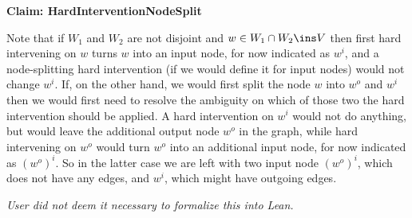 \noindent\textbf{Claim: HardInterventionNodeSplit}\par\smallskip
{\appendixTexSize
    Note that if $W_1$ and $W_2$ are not disjoint and $w \in W_1 \cap W_2 \ins V$
    then first hard intervening on $w$ turns $w$ into an input node, for now indicated as $w^i$, and a node-splitting hard intervention (if we would define it for input nodes) would not change $w^i$.
    If, on the other hand, we would first split the node $w$ into $w^o$ and $w^i$ then we would first need to resolve the ambiguity on which of those two the hard intervention should be applied. A hard intervention on $w^i$ would not do anything, but would leave the additional output node $w^o$ in the graph, while hard intervening on $w^o$ would turn $w^o$ into an additional input node, for now indicated as $(w^o)^i$. So in the latter case we are left with two input node $(w^o)^i$, which does not have any edges, and $w^i$, which might have outgoing edges.
\par}
\smallskip
\textit{User did not deem it necessary to formalize this into Lean.}
~%

\vspace{\appendixNotesGap}

